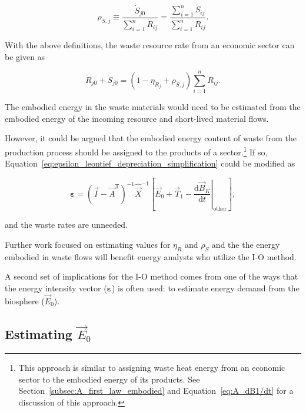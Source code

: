 \begin{equation}
	\rho_{\dot{S},j}
	\equiv \frac{\dot{S}_{j0}}{\sum\limits_{i=1}^{n} \dot{R}_{ij}}
	= \frac{\sum\limits_{i=1}^{n} \dot{S}_{ij}}{\sum\limits_{i=1}^{n} \dot{R}_{ij}}.
\end{equation} 

With the above definitions, the waste resource rate from an economic sector
can be given as

\begin{equation}
	\dot{R}_{j0} + \dot{S}_{j0}
	= (1 - \eta_{\dot{R}_{j}} + \rho_{\dot{S},j}) \sum\limits_{i=1}^{n} \dot{R}_{ij}.
\end{equation}

\noindent{}The embodied energy in the waste materials would need to be estimated
from the embodied energy of the incoming resource and short-lived material flows.

However, it could be argued that the embodied energy content 
of waste from the production process should be 
assigned to the products of a sector.\footnote{This approach 
is similar to assigning waste heat energy from an
economic sector to the embodied energy of its products.
See Section~\ref{subsec:A_first_law_embodied} and
Equation~\ref{eq:A_dB1/dt} for a discussion of this approach.}
If so, Equation~\ref{eq:epsilon_leontief_depreciation_simplification}
could be modified as

\begin{equation} \label{eq:epsilon_leontief_without_waste}
	\bm{\varepsilon} 
	= {(\vec{I} - \vec{A}^{\mathrm{T}})}^{-1}\hat{\vec{X}}^{-1}
		\left[\vec{E}_{0} 
				+ \vec{T}_{1} 
				- \left. \frac{\mathrm{d}\vec{B}_{K}}{\mathrm{d}t} \right|_{\mathrm{other}}
		\right],
\end{equation}

\noindent{}and the waste rates are unneeded.

Further work focused on estimating values for 
$\eta_{\dot{R}}$ and $\rho_{\dot{S}}$
and the the energy embodied in waste flows 
will benefit energy analysts who utilize the I-O method.

A second set of implications for the I-O method 
comes from one of the ways that 
the energy intensity vector ($\bm{\varepsilon}$)
is often used: to estimate energy demand from the biosphere ($\vec{E}_{0}$).


\subsection{Estimating $\vec{E}_{0}$}

